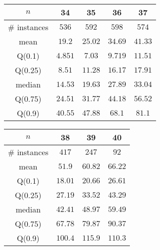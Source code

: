\begin{tabular}{c|cccc} 
\hline 
$n$ & 34 & 35 & 36 & 37 \tabularnewline 
\hline 
\hline 
\# instances & $536$ & $592$ & $598$ & $574$ \tabularnewline 
mean & $19.2$ & $25.02$ & $34.69$ & $41.33$ \tabularnewline 
Q(0.1) & $4.851$ & $7.03$ & $9.719$ & $11.51$ \tabularnewline 
Q(0.25) & $8.51$ & $11.28$ & $16.17$ & $17.91$ \tabularnewline 
median & $14.53$ & $19.63$ & $27.89$ & $33.04$ \tabularnewline 
Q(0.75) & $24.51$ & $31.77$ & $44.18$ & $56.52$ \tabularnewline 
Q(0.9) & $40.55$ & $47.88$ & $68.1$ & $81.1$ \tabularnewline 
\hline 
\end{tabular} 
\medskip{} 

\begin{tabular}{c|ccc} 
\hline 
$n$ & 38 & 39 & 40 \tabularnewline 
\hline 
\hline 
\# instances & $417$ & $247$ & $92$ \tabularnewline 
mean & $51.9$ & $60.82$ & $66.22$ \tabularnewline 
Q(0.1) & $18.01$ & $20.66$ & $26.61$ \tabularnewline 
Q(0.25) & $27.19$ & $33.52$ & $43.29$ \tabularnewline 
median & $42.41$ & $48.97$ & $59.49$ \tabularnewline 
Q(0.75) & $67.78$ & $79.87$ & $90.37$ \tabularnewline 
Q(0.9) & $100.4$ & $115.9$ & $110.3$ \tabularnewline 
\hline 
\end{tabular} 
\medskip{} 

